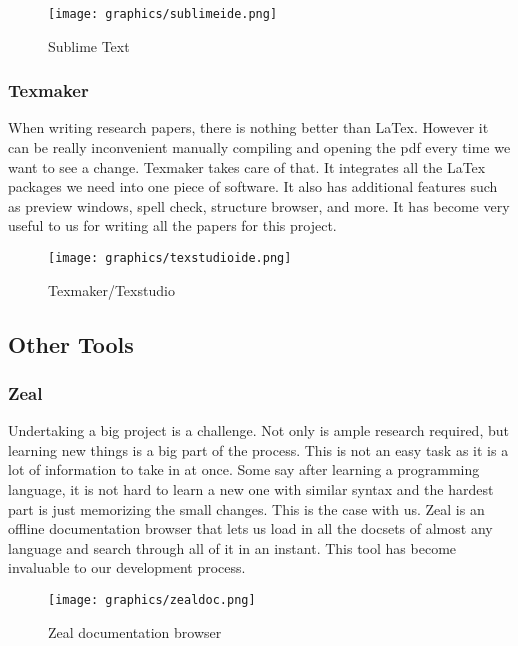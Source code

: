 \documentclass[letterpaper, 12pt]{article}
\begin{document}
\begin{figure}
    \centering
	\texttt{[image: graphics/sublimeide.png]}
    \caption{Sublime Text}
\end{figure}

\newpage

\subsubsection{Texmaker}
When writing research papers, there is nothing better than LaTex. However it can be really 
inconvenient manually compiling and opening the pdf every time we want to see a change. 
Texmaker takes care of that. It integrates all the LaTex packages we need into one piece 
of software. It also has additional features such as preview windows, spell check, 
structure browser, and more. It has become very useful to us for writing all the 
papers for this project.

\begin{figure}
    \centering
	\texttt{[image: graphics/texstudioide.png]}
    \caption{Texmaker/Texstudio}
\end{figure}

\newpage

\subsection{Other Tools}

\subsubsection{Zeal}
Undertaking a big project is a challenge. Not only is ample research required, but learning 
new things is a big part of the process. This is not an easy task as it is a lot of information 
to take in at once. Some say after learning a programming language, it is not hard to learn a 
new one with similar syntax and the hardest part is just memorizing the small changes. This 
is the case with us. Zeal is an offline documentation browser that lets us load in all 
the docsets of almost any language and search through all of it in an instant. This tool 
has become invaluable to our development process. 

\begin{figure}
    \centering
	\texttt{[image: graphics/zealdoc.png]}
    \caption{Zeal documentation browser}
\end{figure}
\end{document}
